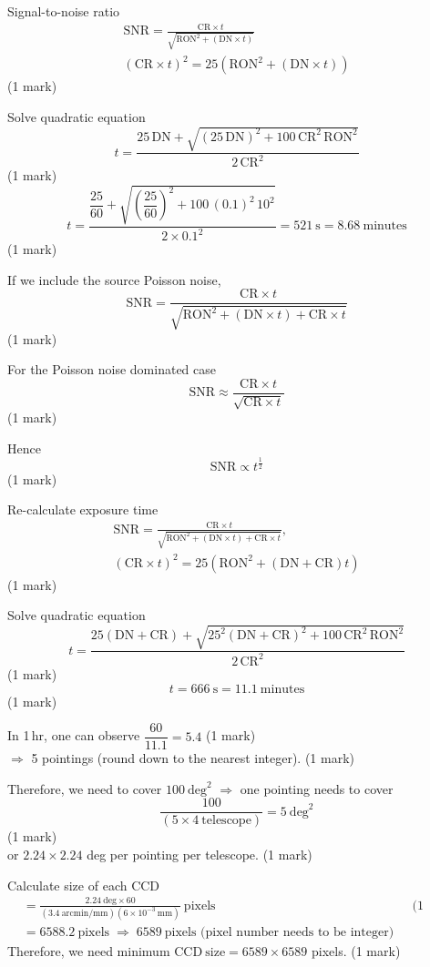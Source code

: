 \begin{description}
Signal-to-noise ratio
\begin{gather*}
\mathrm{SNR} = \frac{\mathrm{CR} \times t}
  {\sqrt{\mathrm{RON}^2 + (\mathrm{DN} \times t)}} \\
(\mathrm{CR} \times t)^2 = 25(\mathrm{RON}^2 + (\mathrm{DN} \times t))
\end{gather*}
\hfill(1 mark)

Solve quadratic equation
\[ t = \frac{25\,\mathrm{DN}
   + \sqrt{(25\,\mathrm{DN})^2 + 100\,\mathrm{CR}^2\,\mathrm{RON}^2}}
   {2\,\mathrm{CR}^2} \]
\hfill(1 mark)
\[ t = \frac{\dfrac{25}{60}
   + \sqrt{\left(\dfrac{25}{60}\right)^2 + 100\,(0.1)^2\,10^2}}
   {2 \times 0.1^2}
   = 521~\mathrm{s} = 8.68~\text{minutes} \]
\hfill(1 mark)

\item[c)]
If we include the source Poisson noise,
\[ \mathrm{SNR} = \frac{\mathrm{CR} \times t}
   {\sqrt{\mathrm{RON}^2 + (\mathrm{DN} \times t) + \mathrm{CR} \times t}} \]
\hfill(1 mark)

For the Poisson noise dominated case
\[ \mathrm{SNR} \approx \frac{\mathrm{CR} \times t}
   {\sqrt{\mathrm{CR} \times t}} \]
\hfill(1 mark)

Hence
\[ \mathrm{SNR} \propto t^{\frac{1}{2}} \]
\hfill(1 mark)

Re-calculate exposure time
\begin{gather*}
\mathrm{SNR} = \frac{\mathrm{CR} \times t}
  {\sqrt{\mathrm{RON}^2 + (\mathrm{DN} \times t) + \mathrm{CR} \times t}}, \\
(\mathrm{CR} \times t)^2
  = 25(\mathrm{RON}^2 + (\mathrm{DN} + \mathrm{CR})t)
\end{gather*}
\hfill(1 mark)

Solve quadratic equation
\[ t = \frac{25(\mathrm{DN} + \mathrm{CR})
   + \sqrt{25^2(\mathrm{DN} + \mathrm{CR})^2
   + 100\,\mathrm{CR}^2\,\mathrm{RON}^2}}{2\,\mathrm{CR}^2} \]
\hfill(1 mark)
\[ t = 666~\mathrm{s} = 11.1~\text{minutes} \]
\hfill(1 mark)

\item[d)]
In 1\,hr, one can observe $\dfrac{60}{11.1} = 5.4$ \hfill(1 mark)\\
$\Rightarrow$ 5 pointings (round down to the nearest integer). \hfill(1 mark)

Therefore, we need to cover $100~\mathrm{deg}^2$ $\Rightarrow$ one pointing
needs to cover
\[ \frac{100}{(5 \times 4~\text{telescope})} = 5~\mathrm{deg}^2 \]
\hfill(1 mark)\\
or $2.24 \times 2.24$ deg per pointing per telescope. \hfill(1 mark)

Calculate size of each CCD
\begin{align*}
  &= \frac{2.24~\mathrm{deg} \times 60}
     {(3.4~\mathrm{arcmin/mm})(6 \times 10^{-3}~\mathrm{mm})}~\text{pixels}
  && \text{(1 mark)} \\
  &= 6588.2~\text{pixels}
   \;\Rightarrow\; 6589~\text{pixels (pixel number needs to be integer)}
\end{align*}
Therefore, we need minimum $\mathrm{CCD~size} = 6589 \times 6589$ pixels.
\hfill(1 mark)
\end{description}

